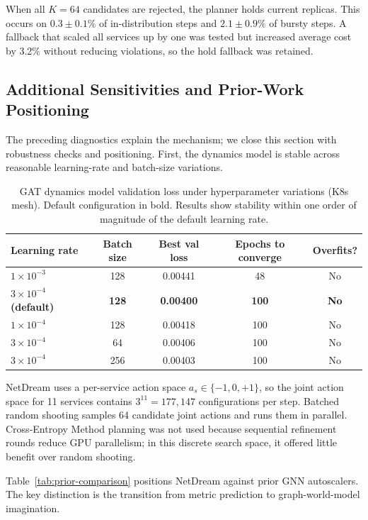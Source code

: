 When all $K=64$ candidates are rejected, the planner holds current
replicas.  This occurs on $0.3\pm0.1\%$ of in-distribution steps and
$2.1\pm0.9\%$ of bursty steps.  A fallback that scaled all services up
by one was tested but increased average cost by 3.2\% without reducing
violations, so the hold fallback was retained.

\subsection{Additional Sensitivities and Prior-Work Positioning}
\label{app:additional}

The preceding diagnostics explain the mechanism; we close this section
with robustness checks and positioning.  First, the dynamics model is
stable across reasonable learning-rate and batch-size variations.

\begin{table}[H]
\centering
\small
\caption{GAT dynamics model validation loss under hyperparameter
variations (K8s mesh). Default configuration in bold.
Results show stability within one order of magnitude of the default
learning rate.}
\label{tab:hparam-sensitivity}
\begin{tabular}{@{}lcccc@{}}
\toprule
Learning rate & Batch size & Best val loss & Epochs to converge & Overfits? \\
\midrule
$1 \times 10^{-3}$ & 128 & 0.00441 & 48 & No \\
\boldmath$3 \times 10^{-4}$ \textbf{(default)} & \textbf{128} & \textbf{0.00400} & \textbf{100} & \textbf{No} \\
$1 \times 10^{-4}$ & 128 & 0.00418 & 100 & No \\
$3 \times 10^{-4}$ & 64  & 0.00406 & 100 & No \\
$3 \times 10^{-4}$ & 256 & 0.00403 & 100 & No \\
\bottomrule
\end{tabular}
\end{table}

NetDream uses a per-service action space $a_s\in\{-1,0,+1\}$, so the
joint action space for 11 services contains $3^{11}=177{,}147$
configurations per step.  Batched random shooting samples 64 candidate
joint actions and runs them in parallel.  Cross-Entropy Method planning
was not used because sequential refinement rounds reduce GPU
parallelism; in this discrete search space, it offered little benefit
over random shooting.

Table~\ref{tab:prior-comparison} positions NetDream against prior GNN
autoscalers.  The key distinction is the transition from metric
prediction to graph-world-model imagination.

